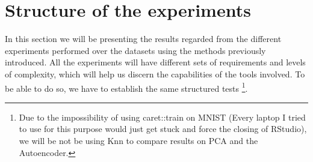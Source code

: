 \section{Structure of the experiments}
In this section we will be presenting the results regarded from the different experiments performed over the datasets using the methods previously introduced. All the experiments will have different sets of requirements and levels of complexity, which will help us discern the capabilities of the tools involved. To be able to do so, we have to establish the same structured tests \footnote{Due to the impossibility of using caret::train on MNIST (Every laptop I tried to use for this purpose would just get stuck and force the closing of RStudio), we will be not be using Knn to compare results on PCA and the Autoencoder. }. \par

